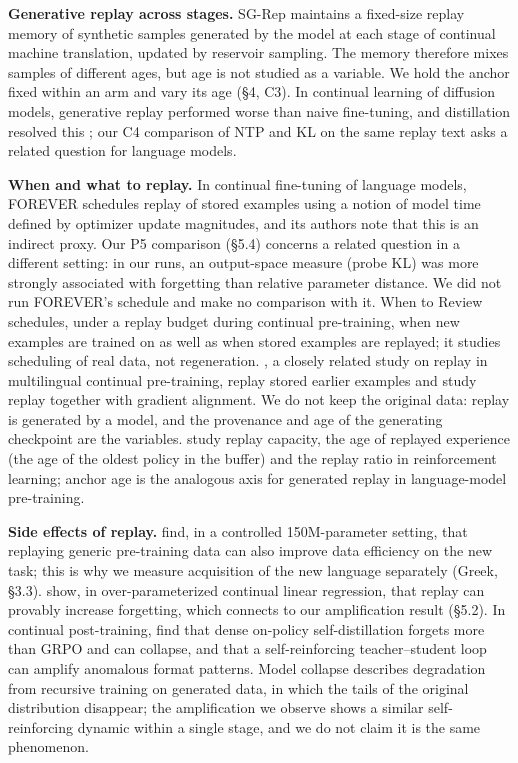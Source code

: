 \documentclass[11pt]{article}
\begin{document}
\textbf{Generative replay across stages.} SG-Rep \citep{resta2024} maintains a fixed-size replay memory of synthetic samples generated by the model at each stage of continual machine translation, updated by reservoir sampling. The memory therefore mixes samples of different ages, but age is not studied as a variable. We hold the anchor fixed within an arm and vary its age (§4, C3). In continual learning of diffusion models, generative replay performed worse than naive fine-tuning, and distillation resolved this \citep{masip2025}; our C4 comparison of NTP and KL on the same replay text asks a related question for language models.

\textbf{When and what to replay.} In continual fine-tuning of language models, FOREVER \citep{feng2026} schedules replay of stored examples using a notion of model time defined by optimizer update magnitudes, and its authors note that this is an indirect proxy. Our P5 comparison (§5.4) concerns a related question in a different setting: in our runs, an output-space measure (probe KL) was more strongly associated with forgetting than relative parameter distance. We did not run FOREVER's schedule and make no comparison with it. When to Review \citep{atreya2026} schedules, under a replay budget during continual pre-training, when new examples are trained on as well as when stored examples are replayed; it studies scheduling of real data, not regeneration. \citet{abbes2026}, a closely related study on replay in multilingual continual pre-training, replay stored earlier examples and study replay together with gradient alignment. We do not keep the original data: replay is generated by a model, and the provenance and age of the generating checkpoint are the variables. \citet{fedus2020} study replay capacity, the age of replayed experience (the age of the oldest policy in the buffer) and the replay ratio in reinforcement learning; anchor age is the analogous axis for generated replay in language-model pre-training.

\textbf{Side effects of replay.} \citet{kotha2026} find, in a controlled 150M-parameter setting, that replaying generic pre-training data can also improve data efficiency on the new task; this is why we measure acquisition of the new language separately (Greek, §3.3). \citet{mahdaviyeh2026} show, in over-parameterized continual linear regression, that replay can provably increase forgetting, which connects to our amplification result (§5.2). In continual post-training, \citet{wang2026} find that dense on-policy self-distillation forgets more than GRPO and can collapse, and that a self-reinforcing teacher–student loop can amplify anomalous format patterns. Model collapse \citep{shumailov2024} describes degradation from recursive training on generated data, in which the tails of the original distribution disappear; the amplification we observe shows a similar self-reinforcing dynamic within a single stage, and we do not claim it is the same phenomenon.
\end{document}
